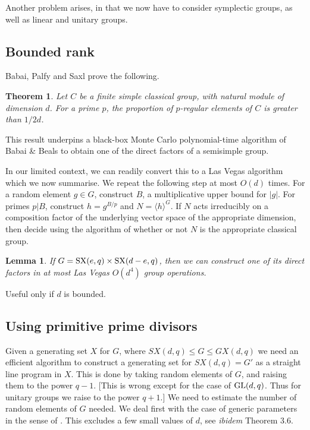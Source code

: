 \documentclass[12pt]{article}
\newtheorem{lemma}[definition]{Lemma}
\newtheorem{theorem}[definition]{Theorem}
\def\GL{{\rm GL}}
\def\SX{{\rm SX}}
\begin{document}
Another problem arises, in that we now have to consider symplectic groups, as
well as linear and unitary groups.


\subsection{Bounded rank}
Babai, Palfy and Saxl \cite{BPS} prove the following.
\begin{theorem}\label{bps}
Let $C$ be a finite simple classical group,
with natural module of dimension $d$.
For a prime $p$, the proportion
of $p$-regular elements
of $C$ is greater than $1/{2d}$.
\end{theorem}

This result underpins a black-box Monte Carlo polynomial-time
algorithm of Babai \& Beals \cite[Claim 5.3]{BabaiBeals99}
to obtain one of the direct factors of a semisimple group.

In our limited context, we can readily convert this
to a Las Vegas algorithm which we now summarise. 
We repeat the following step at most $O(d)$ times.  
For a random element $g \in G$, construct
$B$, a multiplicative upper bound for $|g|$.
For primes $p|B$, construct $h = g^{B/p}$ 
and $N=\langle h \rangle^G$. If $N$ acts
irreducibly on a composition factor of the underlying 
vector space of the appropriate dimension, then decide 
using the algorithm of \cite{NP} whether or not $N$ is the 
appropriate classical group.

\begin{lemma}
If $G=\SX(e,q)\times\SX(d-e,q)$, then
we can construct one of its
direct factors in at most Las Vegas 
$O(d^4)$ group operations.
\end{lemma}
Useful only if $d$ is bounded.

\subsection{Using primitive prime divisors}

Given a generating set $X$ for $G$, where $SX(d,q)\le G\le GX(d,q)$ we need
an efficient algorithm to construct a generating set for $SX(d,q)=G'$ as
a straight line program in $X$.  This is done by taking random elements of
$G$, and raising them to the power $q-1$.
[This is wrong except for the case of $\GL(d,q)$.  Thus for unitary
groups we raise to the power $q+1$.]
 We need to estimate the number
of random elements of $G$ needed.  We deal first with the case of generic
parameters in the sense of \cite{NP}.  
This excludes a few small values of $d$,
see {\it ibidem} Theorem 3.6.  
\end{document}
